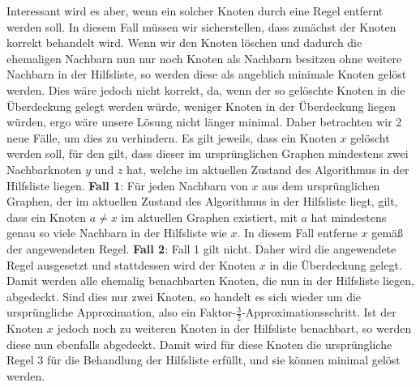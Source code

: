 \documentclass[12pt,onecolumn, notitlepage]{scrartcl}
\begin{document}
Interessant wird es aber, wenn ein solcher Knoten durch eine Regel entfernt werden soll. In diesem Fall müssen wir sicherstellen, dass zunächst der Knoten korrekt behandelt wird. Wenn wir den Knoten löschen und dadurch die ehemaligen Nachbarn nun nur noch Knoten als Nachbarn besitzen ohne weitere Nachbarn in der Hilfsliste, so werden diese als angeblich minimale Knoten gelöst werden. Dies wäre jedoch nicht korrekt, da, wenn der so gelöschte Knoten in die Überdeckung gelegt werden würde, weniger Knoten in der Überdeckung liegen würden, ergo wäre unsere Lösung nicht länger minimal. Daher betrachten wir 2 neue Fälle, um dies zu verhindern.\newline
Es gilt jeweils, dass ein Knoten $x$ gelöscht werden soll, für den gilt, dass dieser im ursprünglichen Graphen mindestens zwei Nachbarknoten $y$ und $z$ hat, welche im aktuellen Zustand des Algorithmus in der Hilfsliste liegen. \newline \newpage
\textbf{Fall 1}:\newline
Für jeden Nachbarn von $x$ aus dem ursprünglichen Graphen, der im aktuellen Zustand des Algorithmus in der Hilfsliste liegt, gilt, dass ein Knoten $a \neq x$ im aktuellen Graphen existiert, mit $a$ hat mindestens genau so viele Nachbarn in der Hilfsliste wie $x$. In diesem Fall entferne $x$ gemäß der angewendeten Regel. \newline\newline
\textbf{Fall 2}:\newline 
Fall 1 gilt nicht. Daher wird die angewendete Regel ausgesetzt und stattdessen wird der Knoten $x$ in die Überdeckung gelegt. Damit werden alle ehemalig benachbarten Knoten, die nun in der Hilfsliste liegen, abgedeckt. Sind dies nur zwei Knoten, so handelt es sich wieder um die ursprüngliche Approximation, also ein Faktor-$\frac{3}{2}$-Approximationsschritt. Ist der Knoten $x$ jedoch noch zu weiteren Knoten in der Hilfsliste benachbart, so werden diese nun ebenfalls abgedeckt. Damit wird für diese Knoten die ursprüngliche Regel 3 für die Behandlung der Hilfsliste erfüllt, und sie können minimal gelöst werden. \newline\newline
\end{document}
